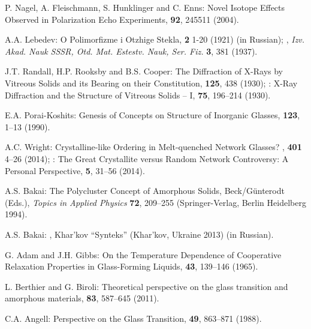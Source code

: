 \documentclass[10pt]{article}
\begin{document}
\begin{thebibliography}{99}
 P. Nagel, A. Fleischmann, S. Hunklinger and C. Enns:
\newblock Novel Isotope Effects Observed in Polarization Echo Experiments,
 {\bf 92}, 245511 (2004).

 A.A. Lebedev:
\newblock O Polimorfizme i Otzhige Stekla,
 {\bf 2} 1-20 (1921) (in Russian);
, {\em Izv. Akad. Nauk SSSR, Otd. Mat. Estestv. Nauk,
Ser. Fiz.} {\bf 3}, 381 (1937).

 J.T. Randall, H.P. Rooksby and B.S. Cooper:
\newblock The Diffraction of X-Rays by Vitreous Solids and its Bearing on
their Constitution,
 {\bf 125}, 438 (1930);
: X-Ray Diffraction and the Structure of Vitreous
Solids -- I,
 {\bf 75}, 196--214 (1930).

 E.A. Porai-Koshits:
\newblock Genesis of Concepts on Structure of Inorganic Glasses,
 {\bf 123}, 1--13 (1990).

 A.C. Wright:
\newblock Crystalline-like Ordering in Melt-quenched Network Glasses?
, {\bf 401} 4--26 (2014);
:
\newblock The Great Crystallite versus Random Network Controversy: A Personal
Perspective,
 {\bf 5}, 31--56 (2014).

 A.S. Bakai:
\newblock The Polycluster Concept of Amorphous Solids,
\newblock Beck/G\"unterodt (Eds.), {\em Topics in Applied Physics} {\bf 72},
209--255 (Springer-Verlag, Berlin Heidelberg 1994).

 A.S. Bakai:
,
\newblock Khar'kov ``Synteks'' (Khar'kov, Ukraine 2013) (in Russian).

G. Adam and J.H. Gibbs:
\newblock On the Temperature Dependence of Cooperative Relaxation Properties
in Glass-Forming Liquids,
 {\bf 43}, 139--146 (1965).

 L. Berthier and G. Biroli:
\newblock Theoretical perspective on the glass transition and amorphous
materials,
 {\bf 83}, 587--645 (2011).

 C.A. Angell:
\newblock Perspective on the Glass Transition,
 {\bf 49}, 863--871 (1988).


\end{thebibliography}
\end{document}
